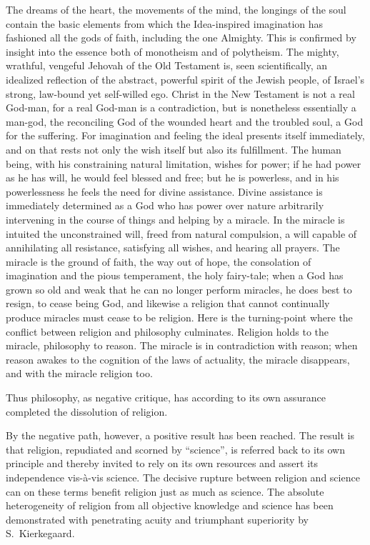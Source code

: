 \documentclass[12pt,a4paper]{article}
\begin{document}
The dreams of the heart, the movements of the mind, the
longings of the soul contain the basic elements from which the
Idea-inspired imagination has fashioned all the gods of faith,
including the one Almighty. This is confirmed by insight into
the essence both of monotheism and of polytheism. The mighty,
wrathful, vengeful Jehovah of the Old Testament is, seen
scientifically, an idealized reflection of the abstract,
powerful spirit of the Jewish people, of Israel's strong,
law-bound yet self-willed ego. Christ in the New Testament is
not a real God-man, for a real God-man is a contradiction, but
is nonetheless essentially a man-god, the reconciling God of the
wounded heart and the troubled soul, a God for the suffering.
For imagination and feeling the ideal presents itself
immediately, and on that rests not only the wish itself but also
its fulfillment. The human being, with his constraining natural
limitation, wishes for power; if he had power as he has will, he
would feel blessed and free; but he is powerless, and in his
powerlessness he feels the need for divine assistance. Divine
assistance is immediately determined as a God who has power over
nature arbitrarily intervening in the course of things and
helping by a miracle. In the miracle is intuited the
unconstrained will, freed from natural compulsion, a will
capable of annihilating all resistance, satisfying all wishes,
and hearing all prayers. The miracle is the ground of faith, the
way out of hope, the consolation of imagination and the pious
temperament, the holy fairy-tale; when a God has grown so old
and weak that he can no longer perform miracles, he does best to
resign, to cease being God, and likewise a religion that cannot
continually produce miracles must cease to be religion. Here is
the turning-point where the conflict between religion and
philosophy culminates. Religion holds to the miracle, philosophy
to reason. The miracle is in contradiction with reason; when
reason awakes to the cognition of the laws of actuality, the
miracle disappears, and with the miracle religion too.

Thus philosophy, as negative critique, has according to its own
assurance completed the dissolution of religion.

By the negative path, however, a positive result has been
reached. The result is that religion, repudiated and scorned by
``science'', is referred back to its own principle and thereby
invited to rely on its own resources and assert its independence
vis-\`{a}-vis science. The decisive rupture between religion and
science can on these terms benefit religion just as much as
science. The absolute heterogeneity of religion from all
objective knowledge and science has been demonstrated with
penetrating acuity and triumphant superiority by S.\
Kierkegaard.
\end{document}
